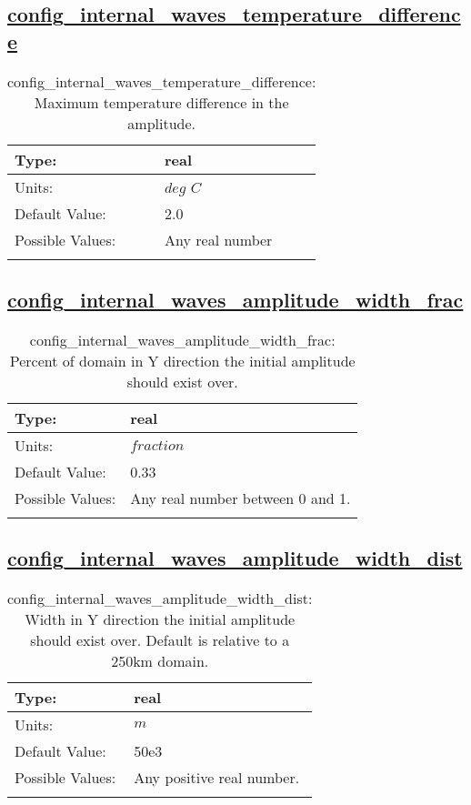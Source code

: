 \subsection[config\_internal\_waves\_temperature\_difference]{\hyperref[sec:nm_tab_internal_waves]{config\_internal\_waves\_temperature\_difference}}
\label{subsec:nm_sec_config_internal_waves_temperature_difference}
\begin{center}
\begin{longtable}{| p{2.0in} || p{4.0in} |}
    \hline
    Type: & real \\
    \hline
    Units: & $deg$ $C$ \\
    \hline
    Default Value: & 2.0 \\
    \hline
    Possible Values: & Any real number \\
    \hline
    \caption{config\_internal\_waves\_temperature\_difference: Maximum temperature difference in the amplitude.}
\end{longtable}
\end{center}
\subsection[config\_internal\_waves\_amplitude\_width\_frac]{\hyperref[sec:nm_tab_internal_waves]{config\_internal\_waves\_amplitude\_width\_frac}}
\label{subsec:nm_sec_config_internal_waves_amplitude_width_frac}
\begin{center}
\begin{longtable}{| p{2.0in} || p{4.0in} |}
    \hline
    Type: & real \\
    \hline
    Units: & $fraction$ \\
    \hline
    Default Value: & 0.33 \\
    \hline
    Possible Values: & Any real number between 0 and 1. \\
    \hline
    \caption{config\_internal\_waves\_amplitude\_width\_frac: Percent of domain in Y direction the initial amplitude should exist over.}
\end{longtable}
\end{center}
\subsection[config\_internal\_waves\_amplitude\_width\_dist]{\hyperref[sec:nm_tab_internal_waves]{config\_internal\_waves\_amplitude\_width\_dist}}
\label{subsec:nm_sec_config_internal_waves_amplitude_width_dist}
\begin{center}
\begin{longtable}{| p{2.0in} || p{4.0in} |}
    \hline
    Type: & real \\
    \hline
    Units: & $m$ \\
    \hline
    Default Value: & 50e3 \\
    \hline
    Possible Values: & Any positive real number. \\
    \hline
    \caption{config\_internal\_waves\_amplitude\_width\_dist: Width in Y direction the initial amplitude should exist over. Default is relative to a 250km domain.}
\end{longtable}
\end{center}
